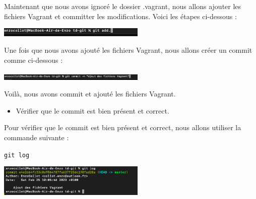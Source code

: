\documentclass[12pt]{article}
\begin{document}
\vspace{0.3cm}

Maintenant que nous avons ignoré le dossier .vagrant, nous allons ajouter les fichiers Vagrant et committer les modifications. Voici les étapes ci-dessous :

\vspace{0.3cm}

\begin{center}
  \includegraphics[width=7cm]{Image-TD-Git-1/git add.png}
\end{center}

Une fois que nous avons ajouté les fichiers Vagrant, nous allons créer un commit comme ci-dessous :

\vspace{0.3cm}

\begin{center}
  \includegraphics[width=7cm]{Image-TD-Git-1/git commit.png}
\end{center}

\vspace{0.3cm}

Voilà, nous avons commit et ajouté les fichiers Vagrant.

\vspace{0.3cm}

\begin{itemize}
  \item Vérifier que le commit est bien présent et correct.
\end{itemize}

\vspace{0.3cm}

Pour vérifier que le commit est bien présent et correct, nous allons utiliser la commande suivante :

\texttt{git log}

\vspace{0.3cm}

\begin{center}
  \includegraphics[width=7cm]{Image-TD-Git-1/git-log.png}
\end{center}
\end{document}
